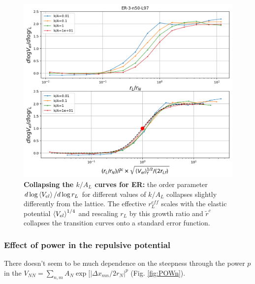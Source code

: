 \documentclass[endfloats,nofootinbib,preprint,floatfix,titlepage,superscriptaddress,linenumbers]{revtex4-1} %
\newcommand{\outNim}[1]{}
\begin{document}
{%
\begin{figure}
    \centering
    \includegraphics[width=.7\textwidth]{fig-09-19/ER-kA-scaled-fit.png}
    \caption{\scriptsize {\bf Collapsing the $k/A_L$ curves for ER:} the order parameter $d\log \left<V_{el}\right> /d \log r_L $ for different values of $k/A_L$ collapses slightly differently from the lattice. 
    The effective $r_L^{eff}$ scales with the elastic potential $\left<V_{el}\right>^{1/4}$ and rescaling $r_L$ by this growth ratio and $\tilde{r}^c$ collapses the transition curves onto a standard error function.}
    \label{fig:l-kA-er}
\end{figure}

\subsubsection{Effect of power in the repulsive potential}
There doesn't seem to be much dependence on the steepness through the power $p$ in the $V_{NN} = \sum_{n,m} A_N \exp[|\Delta x_{mn}/2 r_N|^p $ (Fig. \ref{fig:POWn}).


}
\end{document}
